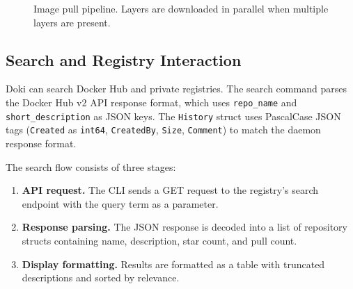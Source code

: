 \begin{figure}[htbp]
  \centering
  \caption{Image pull pipeline. Layers are downloaded in parallel
    when multiple layers are present.}
  \label{fig:image-pull}
\end{figure}

\subsection{Search and Registry Interaction}
\label{sec:search}

Doki can search Docker Hub and private registries. The search command
parses the Docker Hub v2 API response format, which uses
\texttt{repo\_name} and \texttt{short\_description} as JSON keys.
The \texttt{History} struct uses PascalCase JSON tags
(\texttt{Created} as \texttt{int64}, \texttt{CreatedBy},
\texttt{Size}, \texttt{Comment}) to match the daemon response format.

The search flow consists of three stages:

\begin{enumerate}[leftmargin=*, itemsep=3pt]
  \item \textbf{API request.} The CLI sends a GET request to the
        registry's search endpoint with the query term as a parameter.
  \item \textbf{Response parsing.} The JSON response is decoded into
        a list of repository structs containing name, description,
        star count, and pull count.
  \item \textbf{Display formatting.} Results are formatted as a table
        with truncated descriptions and sorted by relevance.
\end{enumerate}


